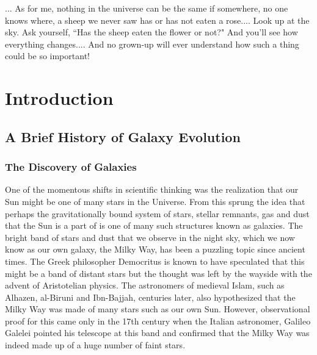 \begin{savequote}[75mm]

... As for me, nothing in the universe can be the same if somewhere, no one knows where, a sheep we never saw has or has not eaten a rose....
Look up at the sky. Ask yourself, ``Has the sheep eaten the flower or not?" And you'll see how everything changes....
And no grown-up will ever understand how such a thing could be so important!
\end{savequote}


\chapter{Introduction}
\label{introduction}

\section{A Brief History of Galaxy Evolution}

\subsection{The Discovery of Galaxies}
One of the momentous shifts in scientific thinking was the realization that our Sun might be one of many stars in the Universe. From this sprung the idea that perhaps the gravitationally bound system of stars, stellar remnants, gas and dust that the Sun is a part of is one of many such structures known as galaxies. The bright band of stars and dust that we observe in the night sky, which we now know as our own galaxy, the Milky Way, has been a puzzling topic since ancient times. The Greek philosopher Democritus is known to have speculated that this might be a band of distant stars but the thought was left by the wayside with the advent of Aristotelian physics. The astronomers of medieval Islam, such as Alhazen, al-Biruni and Ibn-Bajjah, centuries later, also hypothesized that the Milky Way was made of many stars such as our own Sun. However, observational proof for this came only in the 17th century when the Italian astronomer, Galileo Galelei pointed his telescope at this band and confirmed that the Milky Way was indeed made up of a huge number of faint stars.\\


